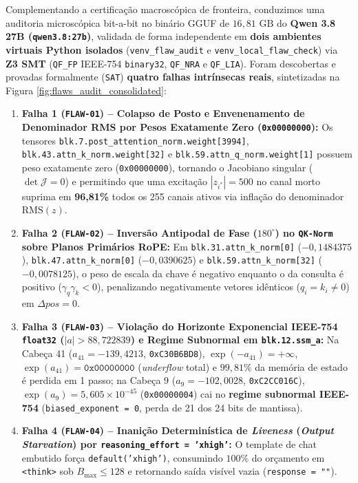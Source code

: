 \documentclass[11pt,a4paper]{article}
\theoremstyle{definition}
\begin{document}
Complementando a certificação macroscópica de fronteira, conduzimos uma auditoria microscópica bit-a-bit no binário GGUF de $16{,}81\text{ GB}$ do \textbf{Qwen 3.8 27B (\texttt{qwen3.8:27b})}, validada de forma independente em \textbf{dois ambientes virtuais Python isolados} (\texttt{venv\_flaw\_audit} e \texttt{venv\_local\_flaw\_check}) via \textbf{Z3 SMT} (\texttt{QF\_FP} IEEE-754 \texttt{binary32}, \texttt{QF\_NRA} e \texttt{QF\_LIA}). Foram descobertas e provadas formalmente (\texttt{SAT}) \textbf{quatro falhas intrínsecas reais}, sintetizadas na Figura \ref{fig:flaws_audit_consolidated}:
\begin{enumerate}
    \item \textbf{Falha 1 (\texttt{FLAW-01}) -- Colapso de Posto e Envenenamento de Denominador RMS por Pesos Exatamente Zero (\texttt{0x00000000}):} Os tensores \texttt{blk.7.post\_attention\_norm.weight[3994]}, \texttt{blk.43.attn\_k\_norm.weight[32]} e \texttt{blk.59.attn\_q\_norm.weight[1]} possuem peso exatamente zero (\texttt{0x00000000}), tornando o Jacobiano singular ($\det \mathcal{J} = 0$) e permitindo que uma excitação $|z_{i^*}|=500$ no canal morto suprima em \textbf{96,81\%} todos os 255 canais ativos via inflação do denominador $\text{RMS}(z)$.
    \item \textbf{Falha 2 (\texttt{FLAW-02}) -- Inversão Antipodal de Fase ($180^\circ$) no \texttt{QK-Norm} sobre Planos Primários RoPE:} Em \texttt{blk.31.attn\_k\_norm[0]} ($-0{,}1484375$), \texttt{blk.47.attn\_k\_norm[0]} ($-0{,}0390625$) e \texttt{blk.59.attn\_k\_norm[32]} ($-0{,}0078125$), o peso de escala da chave é negativo enquanto o da consulta é positivo ($\gamma_q\gamma_k < 0$), penalizando negativamente vetores idênticos ($q_i = k_i \neq 0$) em $\Delta pos = 0$.
    \item \textbf{Falha 3 (\texttt{FLAW-03}) -- Violação do Horizonte Exponencial IEEE-754 \texttt{float32} ($|a| > 88{,}722839$) e Regime Subnormal em \texttt{blk.12.ssm\_a}:} Na Cabeça 41 ($a_{41} = -139{,}4213$, \texttt{0xC30B6BD8}), $\exp(-a_{41}) = +\infty$, $\exp(a_{41}) = \texttt{0x00000000}$ (\textit{underflow} total) e $99{,}81\%$ da memória de estado é perdida em 1 passo; na Cabeça 9 ($a_9 = -102{,}0028$, \texttt{0xC2CC016C}), $\exp(a_9) = 5{,}605 \times 10^{-45}$ (\texttt{0x00000004}) cai no \textbf{regime subnormal IEEE-754} (\texttt{biased\_exponent = 0}, perda de 21 dos 24 bits de mantissa).
    \item \textbf{Falha 4 (\texttt{FLAW-04}) -- Inanição Determinística de \textit{Liveness} (\textit{Output Starvation}) por \texttt{reasoning\_effort = 'xhigh'}:} O template de chat embutido força \texttt{default('xhigh')}, consumindo $100\%$ do orçamento em \texttt{<think>} sob $B_{\max} \le 128$ e retornando saída visível vazia (\texttt{response = ""}).
\end{enumerate}
\end{document}
